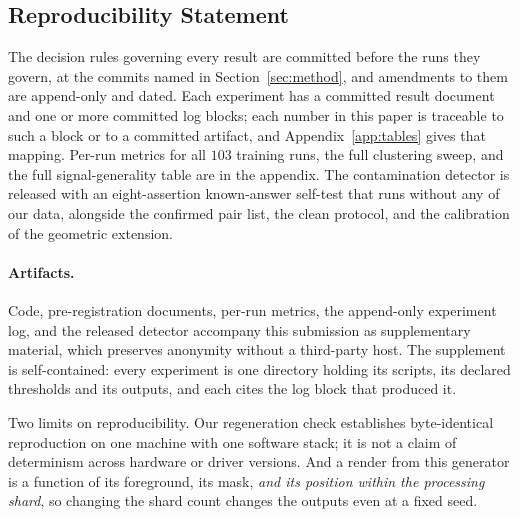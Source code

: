 \documentclass{article} %
\begin{document}
\subsection*{Reproducibility Statement}

The decision rules governing every result are committed before the runs they govern, at the commits
named in Section~\ref{sec:method}, and amendments to them are append-only and dated. Each experiment
has a committed result document and one or more committed log blocks; each number in this paper is
traceable to such a block or to a committed artifact, and Appendix~\ref{app:tables} gives that
mapping. Per-run metrics for all $103$ training runs, the full clustering sweep, and the full
signal-generality table are in the appendix. The contamination detector is released with an
eight-assertion known-answer self-test that runs without any of our data, alongside the confirmed
pair list, the clean protocol, and the calibration of the geometric extension.

\paragraph{Artifacts.} Code, pre-registration documents, per-run metrics, the append-only experiment
log, and the released detector accompany this submission as supplementary material, which preserves
anonymity without a third-party host.
The supplement is self-contained: every experiment is one directory holding its
scripts, its declared thresholds and its outputs, and each cites the log block that produced it.

Two limits on reproducibility. Our regeneration check
establishes byte-identical reproduction on one machine with one software stack; it is not a claim of
determinism across hardware or driver versions. And a render from this generator is a function of its
foreground, its mask, \emph{and its position within the processing shard}, so changing the shard count
changes the outputs even at a fixed seed.




\appendix

\end{document}
